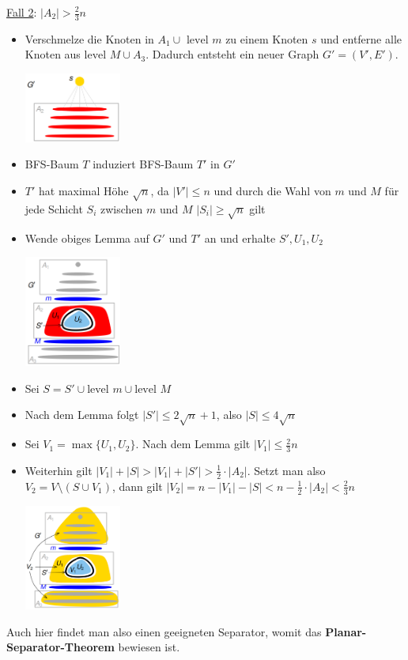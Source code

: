 \underline{Fall 2}: $|A_2|>\frac{2}{3}n$
\begin{itemize}
	\item Verschmelze die Knoten in $A_1\cup \text{ level }m$ zu einem Knoten $s$ und entferne alle Knoten aus $\text{level }M\cup A_3$. Dadurch entsteht ein neuer Graph $G'=(V',E')$.
	\begin{center}
		\includegraphics[width=0.25\textwidth]{images/pst-9.png}
	\end{center}
	\item BFS-Baum $T$ induziert BFS-Baum $T'$ in $G'$
	\item $T'$ hat maximal Höhe $\sqrt{n}$, da $|V'|\leq n$ und durch die Wahl von $m$ und $M$ für jede Schicht $S_i$ zwischen $m$ und $M$ $|S_i|\geq\sqrt{n}$ gilt
	\item Wende obiges Lemma auf $G'$ und $T'$ an und erhalte $S', U_1, U_2$
	\begin{center}
		\includegraphics[width=0.25\textwidth]{images/pst-10.png}
	\end{center}
	\item Sei $S=S'\cup\text{level } m\cup\text{level } M$
	\item Nach dem Lemma folgt $|S'|\leq 2\sqrt{n}+1$, also $|S|\leq4\sqrt{n}$
	\item Sei $V_1=\max\{U_1,U_2\}.$ Nach dem Lemma gilt $|V_1|\leq\frac{2}{3}n$
	\item Weiterhin gilt $|V_1|+|S|>|V_1|+|S'|>\frac{1}{2}\cdot|A_2|$. Setzt man also $V_2=V\setminus(S\cup V_1)$, dann gilt $|V_2|=n-|V_1|-|S|<n-\frac{1}{2}\cdot |A_2|<\frac{2}{3}n$
	\begin{center}
		\includegraphics[width=0.25\textwidth]{images/pst-11.png}
	\end{center}
\end{itemize}

Auch hier findet man also einen geeigneten Separator, womit das \textbf{Planar-Separator-Theorem} bewiesen ist.

